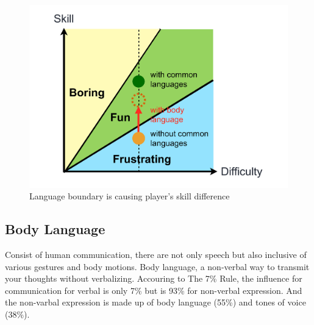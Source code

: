 \begin{figure}[!h]
\centering
\includegraphics[width=0.9\columnwidth]{Figures/GD_F1.pdf}
\caption{Language boundary is causing player's skill difference}
\label{fig:GD_F1}
\end{figure}

\subsection{Body Language}


Consist of human communication, there are not only speech but also inclusive of various gestures and body motions. Body language, a non-verbal way to transmit your thoughts without verbalizing. Accouring to The 7\% Rule\cite{GD2}, the influence for communication for verbal is only 7\% but is 93\% for non-verbal expression. And the non-varbal expression is made up of body language (55\%) and tones of voice (38\%).


